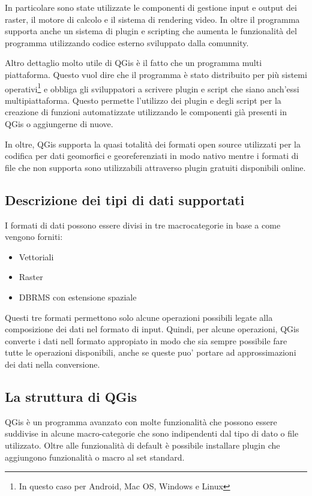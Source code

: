 In particolare sono state utilizzate le componenti di gestione input e output dei raster, il motore di calcolo e il sistema di rendering video. In oltre il programma supporta anche un sistema di plugin e scripting che aumenta le funzionalità del programma utilizzando codice esterno sviluppato dalla comunnity.

Altro dettaglio molto utile di QGis è il fatto che un programma multi piattaforma. Questo vuol dire che il programma è stato distribuito per più sistemi operativi\footnote{In questo caso per Android, Mac OS, Windows e Linux} e obbliga gli sviluppatori a scrivere plugin e script che siano anch'essi multipiattaforma. Questo permette l'utilizzo dei plugin e degli script per la creazione di funzioni automatizzate utilizzando le componenti già presenti in QGis o aggiungerne di nuove.

In oltre, QGis supporta la quasi totalità dei formati open source utilizzati per la codifica per dati geomorfici e georeferenziati in modo nativo mentre i formati di file che non supporta sono utilizzabili attraverso plugin gratuiti disponibili online.

\subsection{Descrizione dei tipi di dati supportati}

I formati di dati possono essere divisi in tre macrocategorie in base a come vengono forniti:
\begin{itemize}
	\item Vettoriali
	\item Raster
	\item DBRMS con estensione spaziale
\end{itemize}

Questi tre formati permettono solo alcune operazioni possibili legate alla composizione dei dati nel formato di input.
Quindi, per alcune operazioni, QGis converte i dati nell formato appropiato in modo che sia sempre possibile fare tutte le operazioni disponibili, anche se queste puo' portare ad approssimazioni dei dati nella conversione.

\subsection{La struttura di QGis}
QGis è un programma avanzato con molte funzionalità che possono essere suddivise in alcune macro-categorie che sono indipendenti dal tipo di dato o file utilizzato.
Oltre alle funzionalità di default è possibile installare plugin che aggiungono funzionalità o macro al set standard.


